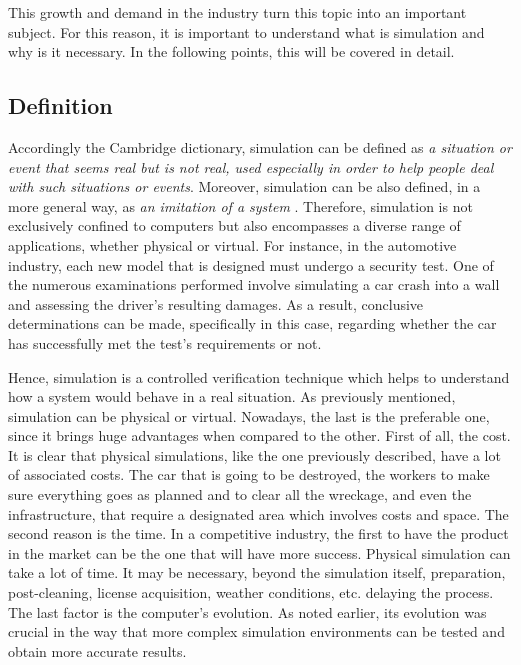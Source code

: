 This growth and demand in the industry turn this topic into an important subject. For this reason, it is important to understand what is simulation and why is it necessary. In the following points, this will be covered in detail.

\subsection{Definition}
\label{subsec:WhatIsSimulation}

Accordingly the Cambridge dictionary, simulation can be defined as \emph{a situation or event that seems real but is not real, used especially in order to help people deal with such situations or events}. Moreover, simulation can be also defined, in a more general way, as \emph{an imitation of a system} \cite{SimulationBook}. Therefore, simulation is not exclusively confined to computers but also encompasses a diverse range of applications, whether physical or virtual. For instance, in the automotive industry, each new model that is designed must undergo a security test. One of the numerous examinations performed involve simulating a car crash into a wall and assessing the driver's resulting damages. As a result, conclusive determinations can be made, specifically in this case, regarding whether the car has successfully met the test's requirements or not.

Hence, simulation is a controlled verification technique which helps to understand how a system would behave in a real situation. As previously mentioned, simulation can be physical or virtual. Nowadays, the last is the preferable one, since it brings huge advantages when compared to the other. First of all, the cost. It is clear that physical simulations, like the one previously described, have a lot of associated costs. The car that is going to be destroyed, the workers to make sure everything goes as planned and to clear all the wreckage, and even the infrastructure, that require a designated area which involves costs and space. The second reason is the time. In a competitive industry, the first to have the product in the market can be the one that will have more success. Physical simulation can take a lot of time. It may be necessary, beyond the simulation itself, preparation, post-cleaning, license acquisition, weather conditions, etc. delaying the process. The last factor is the computer's evolution. As noted earlier, its evolution was crucial in the way that more complex simulation environments can be tested and obtain more accurate results.

